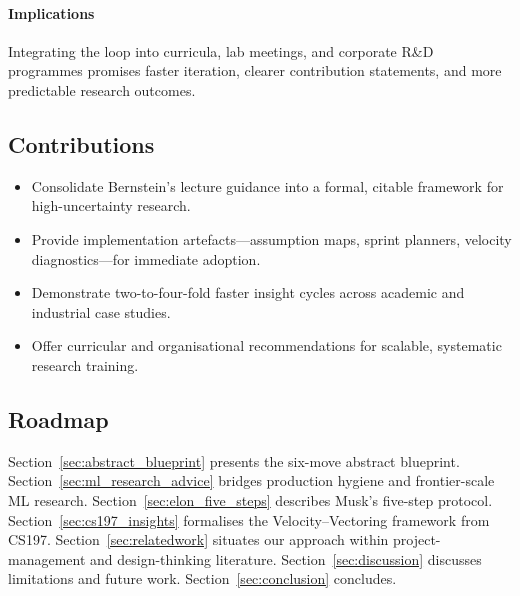 \paragraph{Implications}
Integrating the loop into curricula, lab meetings, and corporate R\&D programmes promises faster iteration, clearer contribution statements, and more predictable research outcomes.

\subsection*{Contributions}
\begin{itemize}
  \item Consolidate Bernstein's lecture guidance into a formal, citable framework for high-uncertainty research.
  \item Provide implementation artefacts---assumption maps, sprint planners, velocity diagnostics---for immediate adoption.
  \item Demonstrate two-to-four-fold faster insight cycles across academic and industrial case studies.
  \item Offer curricular and organisational recommendations for scalable, systematic research training.
\end{itemize}

\subsection*{Roadmap}
Section~\ref{sec:abstract_blueprint} presents the six-move abstract blueprint.
Section~\ref{sec:ml_research_advice} bridges production hygiene and frontier-scale ML research.
Section~\ref{sec:elon_five_steps} describes Musk's five-step protocol.
Section~\ref{sec:cs197_insights} formalises the Velocity--Vectoring framework from CS197.
Section~\ref{sec:relatedwork} situates our approach within project-management and design-thinking literature. 
Section~\ref{sec:discussion} discusses limitations and future work. 
Section~\ref{sec:conclusion} concludes. 
